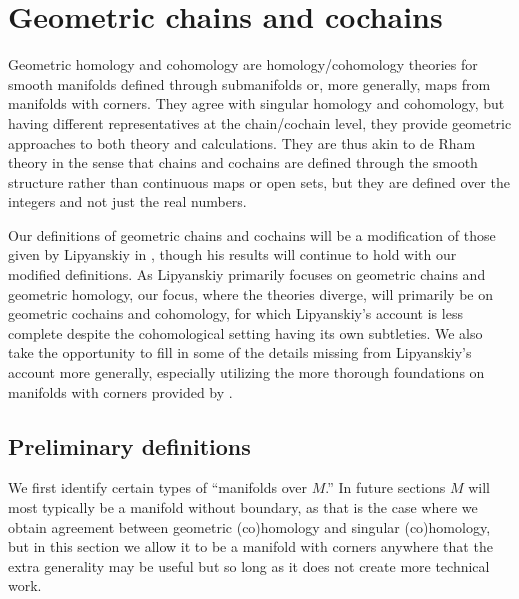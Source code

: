 
\section{Geometric chains and cochains}\label{S: geometric cochains}

Geometric homology and cohomology are homology/cohomology theories for smooth manifolds defined through submanifolds or, more generally, maps from manifolds with corners.
They agree with singular homology and cohomology, but having different representatives
at the chain/cochain level, they provide geometric approaches to both theory and calculations.
They are thus akin to de Rham theory in the sense that chains and cochains are defined through the smooth structure rather than continuous maps or open sets, but they are defined over the integers and not just the real numbers.

Our definitions of geometric chains and cochains will be a modification of those given by Lipyanskiy in \cite{Lipy14}, though his results will continue to hold with our modified definitions.
As Lipyanskiy primarily focuses on geometric chains and geometric homology, our focus, where the theories diverge, will primarily be on geometric cochains and cohomology, for which Lipyanskiy's account is less complete despite the cohomological setting having its own subtleties.
We also take the opportunity to fill in some of the details missing from Lipyanskiy's account more generally, especially utilizing the more thorough foundations on manifolds with corners provided by \cite{Joy12,MaDo92}.

\subsection{Preliminary definitions}\label{S: prelims}


We first identify certain types of ``manifolds over $M$.'' In future sections $M$ will most typically be a manifold without boundary, as that is the case where we obtain agreement between geometric (co)homology and singular (co)homology, but in this section we allow it to be a manifold with corners anywhere that the extra generality may be useful but so long as it does not create more technical work.

